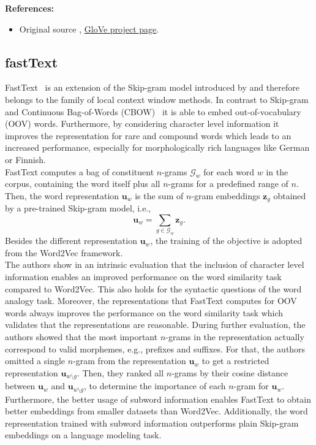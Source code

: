 \documentclass[11pt, a4paper]{amsart}
\begin{document}
\textbf{References:}
\begin{itemize}
	\item Original source \cite{pennington-etal-2014-glove},
	\href{https://nlp.stanford.edu/projects/glove/}{GloVe project page}.
\end{itemize}

\subsection{fastText}

FastText~\cite{DBLP:journals/corr/BojanowskiGJM16} is an extension of the Skip-gram model introduced by \cite{DBLP:journals/corr/MikolovSCCD13} and therefore belongs to the family of local context window methods. In contrast to Skip-gram and Continuous Bag-of-Words (CBOW)~\cite{DBLP:journals/corr/MikolovSCCD13} it is able to embed out-of-vocabulary (OOV) words. Furthermore, by considering character level information it improves the representation for rare and compound words which leads to an increased performance, especially for morphologically rich languages like German or Finnish.\\

FastText computes a bag of constituent $n$-grams $\mathcal{G}_w$ for each word $w$ in the corpus, containing the word itself plus all $n$-grams for a predefined range of $n$. Then, the word representation $\textbf{u}_w$ is the sum of $n$-gram embeddings $\textbf{z}_g$ obtained by a pre-trained Skip-gram model, i.e.,
\begin{equation}
	\textbf{u}_w = \sum_{g \in \mathcal{G}_w} \textbf{z}_g.
\end{equation}
Besides the different representation $\textbf{u}_w$, the training of the objective is adopted from the Word2Vec framework.\\

The authors show in an intrinsic evaluation that the inclusion of character level information enables an improved performance on the word similarity task compared to Word2Vec. This also holds for the syntactic questions of the word analogy task. Moreover, the representations that FastText computes for OOV words always improves the performance on the word similarity task which validates that the representations are reasonable. During further evaluation, the authors showed that the most important $n$-grams in the representation actually correspond to valid morphemes, e.g., prefixes and suffixes. For that, the authors omitted a single $n$-gram from the representation $\textbf{u}_w$ to get a restricted representation $\textbf{u}_{w\setminus g}$. Then, they ranked all $n$-grams by their cosine distance between $\textbf{u}_w$ and $\textbf{u}_{w\setminus g}$, to determine the importance of each $n$-gram for $\textbf{u}_w$. Furthermore, the better usage of subword information enables FastText to obtain better embeddings from smaller datasets than Word2Vec. Additionally, the word representation trained with subword information outperforms plain Skip-gram embeddings on a language modeling task.
\end{document}
